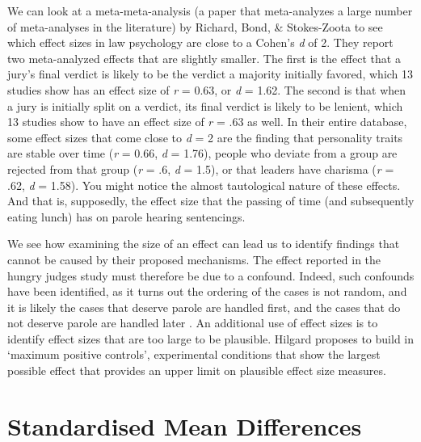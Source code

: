\documentclass[
  oneside]{krantz}
\begin{document}
We can look at a meta-meta-analysis (a paper that meta-analyzes a large number of meta-analyses in the literature) by Richard, Bond, \& Stokes-Zoota \citeyearpar{richard_one_2003} to see which effect sizes in law psychology are close to a Cohen's \emph{d} of 2. They report two meta-analyzed effects that are slightly smaller. The first is the effect that a jury's final verdict is likely to be the verdict a majority initially favored, which 13 studies show has an effect size of \emph{r} = 0.63, or \emph{d} = 1.62. The second is that when a jury is initially split on a verdict, its final verdict is likely to be lenient, which 13 studies show to have an effect size of \emph{r} = .63 as well. In their entire database, some effect sizes that come close to \emph{d} = 2 are the finding that personality traits are stable over time (\emph{r} = 0.66, \emph{d} = 1.76), people who deviate from a group are rejected from that group (\emph{r} = .6, \emph{d} = 1.5), or that leaders have charisma (\emph{r} = .62, \emph{d} = 1.58). You might notice the almost tautological nature of these effects. And that is, supposedly, the effect size that the passing of time (and subsequently eating lunch) has on parole hearing sentencings.

We see how examining the size of an effect can lead us to identify findings that cannot be caused by their proposed mechanisms. The effect reported in the hungry judges study must therefore be due to a confound. Indeed, such confounds have been identified, as it turns out the ordering of the cases is not random, and it is likely the cases that deserve parole are handled first, and the cases that do not deserve parole are handled later \citep{weinshall-margel_overlooked_2011, chatziathanasiou_beware_2022}. An additional use of effect sizes is to identify effect sizes that are too large to be plausible. Hilgard \citeyearpar{hilgard_maximal_2021} proposes to build in `maximum positive controls', experimental conditions that show the largest possible effect that provides an upper limit on plausible effect size measures.

\hypertarget{cohend}{%
\section{Standardised Mean Differences}\label{cohend}}
\end{document}
